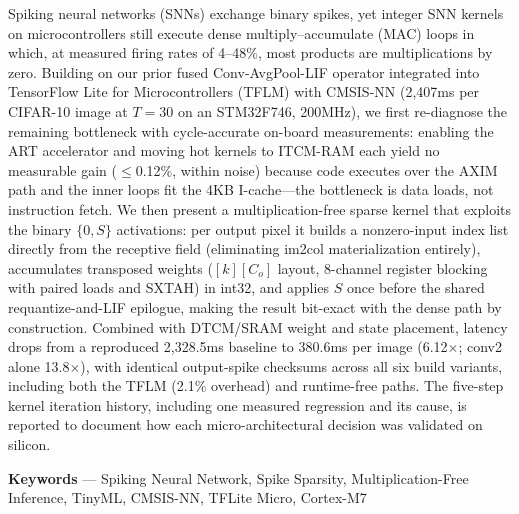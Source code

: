 Spiking neural networks (SNNs) exchange binary spikes, yet integer SNN kernels on microcontrollers still execute dense multiply--accumulate (MAC) loops in which, at measured firing rates of 4--48\%, most products are multiplications by zero. Building on our prior fused Conv-AvgPool-LIF operator integrated into TensorFlow Lite for Microcontrollers (TFLM) with CMSIS-NN (2,407ms per CIFAR-10 image at $T{=}30$ on an STM32F746, 200MHz), we first re-diagnose the remaining bottleneck with cycle-accurate on-board measurements: enabling the ART accelerator and moving hot kernels to ITCM-RAM each yield no measurable gain ($\le$0.12\%, within noise) because code executes over the AXIM path and the inner loops fit the 4KB I-cache---the bottleneck is data loads, not instruction fetch. We then present a multiplication-free sparse kernel that exploits the binary $\{0, S\}$ activations: per output pixel it builds a nonzero-input index list directly from the receptive field (eliminating im2col materialization entirely), accumulates transposed weights ($[k][C_o]$ layout, 8-channel register blocking with paired loads and SXTAH) in int32, and applies $S$ once before the shared requantize-and-LIF epilogue, making the result bit-exact with the dense path by construction. Combined with DTCM/SRAM weight and state placement, latency drops from a reproduced 2,328.5ms baseline to 380.6ms per image (6.12$\times$; conv2 alone 13.8$\times$), with identical output-spike checksums across all six build variants, including both the TFLM (2.1\% overhead) and runtime-free paths. The five-step kernel iteration history, including one measured regression and its cause, is reported to document how each micro-architectural decision was validated on silicon.
\par\vspace{0.5\baselineskip}\noindent
\textbf{Keywords} --- Spiking Neural Network, Spike Sparsity, Multiplication-Free Inference, TinyML, CMSIS-NN, TFLite Micro, Cortex-M7
